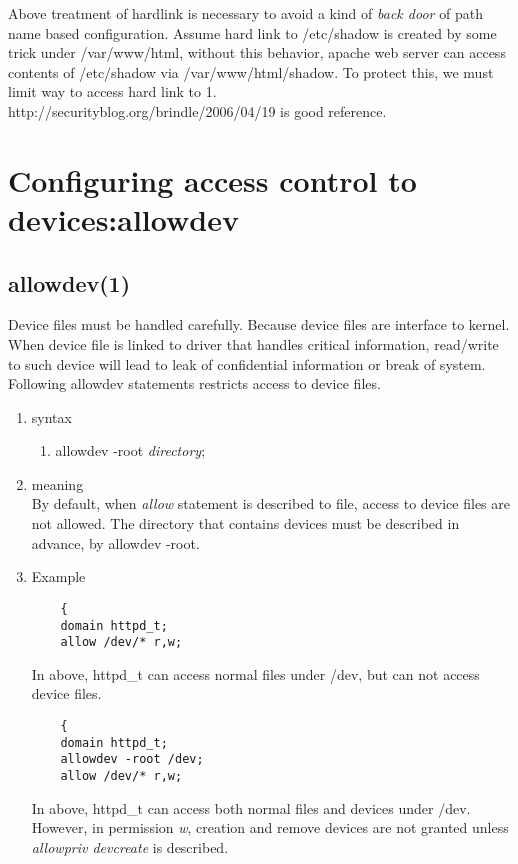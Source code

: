 \documentclass{article}
\begin{document}
       Above treatment of hardlink is necessary to avoid a kind of {\it back door }
       of path name based configuration. Assume hard link to
       /etc/shadow is created by some trick under /var/www/html, without this
       behavior, apache web server can access contents of /etc/shadow
       via /var/www/html/shadow. To protect this, we must limit way to access
       hard link to 1.\\
       http://securityblog.org/brindle/2006/04/19 is good reference.\\



\section{Configuring access control to devices:allowdev}
\subsection{allowdev(1)}
 Device files must be handled carefully. Because device files are
interface to kernel. When device file is linked to driver that handles
critical information, read/write to such device will lead to leak of
confidential information or break of system. Following allowdev
statements restricts access to device files.
\begin{enumerate}
 \item syntax
      \begin{enumerate}
       \item allowdev -root {\it directory};
      \end{enumerate}
 \item meaning\\
	By default, when {\it allow} statement is described to file,
	access to device files are not allowed. The directory that
	contains devices must be described in advance, by allowdev
	-root.

 \item Example\\
       \begin{verbatim}
	{ 
	domain httpd_t;
	allow /dev/* r,w;
       \end{verbatim}
       In above, httpd\_t can access normal files under /dev, but can
       not access device files.
       \begin{verbatim}
	{ 
	domain httpd_t;
	allowdev -root /dev;
	allow /dev/* r,w;
       \end{verbatim}
       In above, httpd\_t can access both normal files and devices under
       /dev.
       However, in permission {\it w}, creation and remove devices are not granted unless {\it allowpriv devcreate } is described. 
\end{enumerate}
\end{document}
